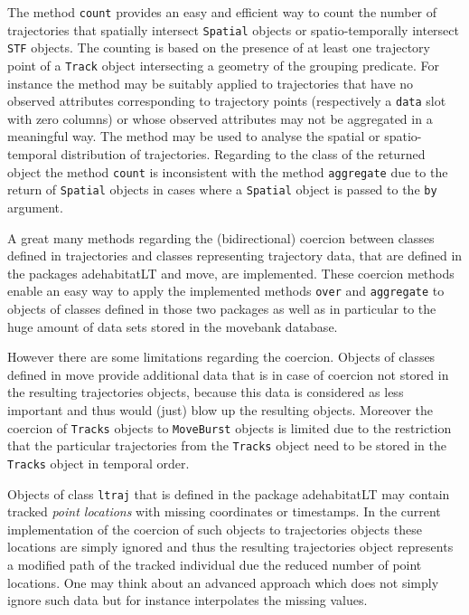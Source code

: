 \documentclass[12pt, oneside, a4paper]{scrbook}
\newcommand{\pkg}[1]{{\normalfont\fontseries{b}\selectfont #1}}
\let\code=\texttt
\begin{document}
The method \code{count} provides an easy and efficient way to count the number of trajectories that spatially intersect \code{Spatial} objects or spatio-temporally intersect \code{STF} objects. 
The counting is based on the presence of at least one trajectory point of a \code{Track} object intersecting a geometry of the grouping predicate. 
For instance the method may be suitably applied to trajectories that have no observed attributes corresponding to trajectory points (respectively a \code{data} slot with zero columns) or whose observed attributes may not be aggregated in a meaningful way. 
The method may be used to analyse the spatial or spatio-temporal distribution of trajectories. 
Regarding to the class of the returned object the method \code{count} is inconsistent with the method \code{aggregate} due to the return of \code{Spatial} objects in cases where a \code{Spatial} object is passed to the \code{by} argument.
\par\medskip

A great many methods regarding the (bidirectional) coercion between classes defined in \pkg{trajectories} and classes representing trajectory data, that are defined in the packages \pkg{adehabitatLT} and \pkg{move}, are implemented. 
These coercion methods enable an easy way to apply the implemented methods \code{over} and \code{aggregate} to objects of classes defined in those two packages as well as in particular to the huge amount of data sets stored in the movebank database.
\par\medskip

However there are some limitations regarding the coercion. 
Objects of classes defined in \pkg{move} provide additional data that is in case of coercion not stored in the resulting \pkg{trajectories} objects, because this data is considered as less important and thus would (just) blow up the resulting objects. 
Moreover the coercion of \code{Tracks} objects to \code{MoveBurst} objects is limited due to the restriction that the particular trajectories from the \code{Tracks} object need to be stored in the \code{Tracks} object in temporal order.
\par\medskip

Objects of class \code{ltraj} that is defined in the package \pkg{adehabitatLT} may contain tracked \textit{point locations} with missing coordinates or timestamps. 
In the current implementation of the coercion of such objects to \pkg{trajectories} objects these locations are simply ignored and thus the resulting trajectories object represents a modified path of the tracked individual due the reduced number of point locations.
One may think about an advanced approach which does not simply ignore such data but for instance interpolates the missing values. 
\par\medskip
\end{document}
